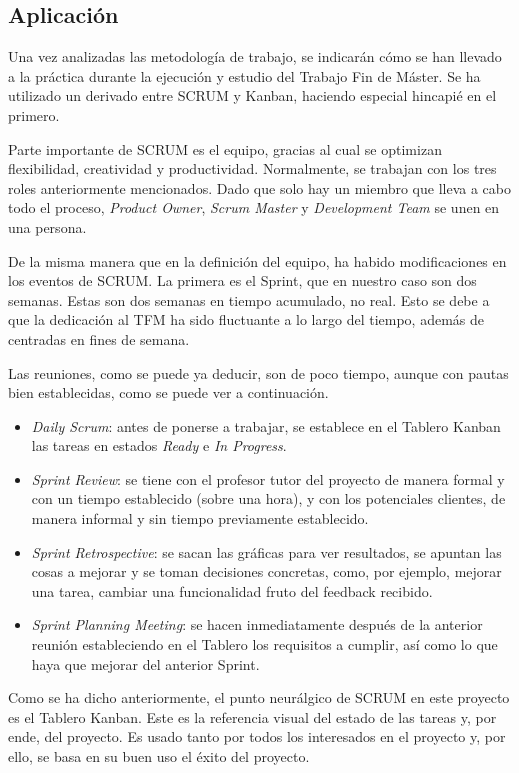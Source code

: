 \subsection{Aplicación}
Una vez analizadas las metodología de trabajo, se indicarán cómo se han llevado a la práctica durante la ejecución y estudio del Trabajo Fin de Máster. Se ha utilizado un derivado entre SCRUM y Kanban, haciendo especial hincapié en el primero.

Parte importante de SCRUM es el equipo, gracias al cual se optimizan flexibilidad, creatividad y productividad. Normalmente, se trabajan con los tres roles anteriormente mencionados. Dado que solo hay un miembro que lleva a cabo todo el proceso, \textit{Product Owner}, \textit{Scrum Master} y \textit{Development Team} se unen en una persona.

De la misma manera que en la definición del equipo, ha habido modificaciones en los eventos de SCRUM. La primera es el Sprint, que en nuestro caso son dos semanas. Estas son dos semanas en tiempo acumulado, no real. Esto se debe a que la dedicación al TFM ha sido fluctuante a lo largo del tiempo, además de centradas en fines de semana.

Las reuniones, como se puede ya deducir, son de poco tiempo, aunque con pautas bien establecidas, como se puede ver a continuación.
\begin{itemize}
    \item \textit{Daily Scrum}: antes de ponerse a trabajar, se establece en el Tablero Kanban las tareas en estados \textit{Ready} e \textit{In Progress}.
    \item \textit{Sprint Review}: se tiene con el profesor tutor del proyecto de manera formal y con un tiempo establecido (sobre una hora), y con los potenciales clientes, de manera informal y sin tiempo previamente establecido.
    \item \textit{Sprint Retrospective}: se sacan las gráficas para ver resultados, se apuntan las cosas a mejorar y se toman decisiones concretas, como, por ejemplo, mejorar una tarea, cambiar una funcionalidad fruto del feedback recibido.
    \item \textit{Sprint Planning Meeting}: se hacen inmediatamente después de la anterior reunión estableciendo en el Tablero los requisitos a cumplir, así como lo que haya que mejorar del anterior Sprint.
\end{itemize}

Como se ha dicho anteriormente, el punto neurálgico de SCRUM en este proyecto es el Tablero Kanban. Este es la referencia visual del estado de las tareas y, por ende, del proyecto. Es usado tanto por todos los interesados en el proyecto y, por ello, se basa en su buen uso el éxito del proyecto.

